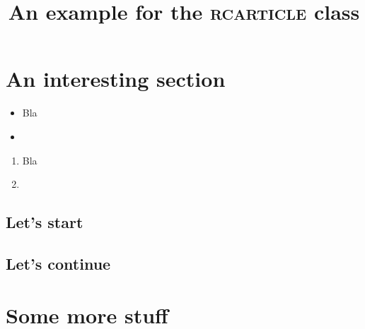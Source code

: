 \documentclass[english]{rcarticle}
\title{An example for the \textsc{rcarticle} class}
\begin{document}
\maketitle

\section{An interesting section}

\begin{itemize}
\item Bla
\item \lipsum[1]
\end{itemize}

\lipsum[1]

\begin{enumerate}
\item Bla
\item \lipsum[1]
\end{enumerate}

\subsection{Let's start}

\lipsum[2-5]

\subsection{Let's continue}

\lipsum[6-10]

\section{Some more stuff}

\lipsum[11-15]
\end{document}

